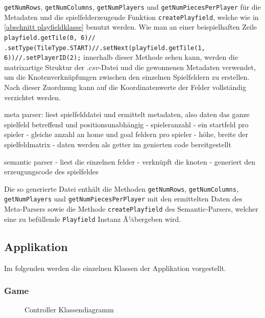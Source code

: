 \documentclass[conference]{IEEEtran}
\begin{document}
\texttt{getNumRows},
\texttt{getNumColumns},
\texttt{getNumPlayers} und
\texttt{getNumPiecesPerPlayer}
für die Metadaten und die spielfelderzeugende Funktion \texttt{createPlayfield}, welche wie in \ref{abschnitt playfieldklasse} benutzt werden. Wie man an einer beispielhaften Zeile \texttt{playfield.getTile(0, 6)// 
.setType(TileType.START)//.setNext(playfield.getTile(1, 6))//.setPlayerID(2);} innerhalb dieser Methode sehen kann, werden die matrixartige Struktur der $.csv$-Datei und die gewonnenen Metadaten verwendet, um die Knotenverknüpfungen zwischen den einzelnen Spielfeldern zu erstellen. Nach dieser Zuordnung kann auf die Koordinatenwerte der Felder vollständig
verzichtet werden.

meta parser:
 liest spielfelddatei und ermittelt metadaten, also daten das ganze spielfeld betreffend und positionsunabh\"angig
 - spieleranzahl
 - ein startfeld pro spieler
 - gleiche anzahl an home und goal feldern pro spieler
 - h\"ohe, breite der spielfeldmatrix
 - daten werden als getter im genierten code bereitgestellt

semantic parser
 - liest die einzelnen felder
 - verkn\"upft die knoten
 - generiert den erzeugungscode des spielfeldes

Die so generierte Datei enth\"alt die Methoden \texttt{getNumRows}, \texttt{getNumColumns}, \texttt{getNumPlayers} und \texttt{getNumPiecesPerPlayer} mit den ermittelten Daten des Meta-Parsers
sowie die Methode \texttt{createPlayfield} des Semantic-Parsers, welcher eine zu bef\"ullende \texttt{Playfield} Instanz Ã¼bergeben wird.



  \subsection{Applikation}

  Im folgenden werden die einzelnen Klassen der Applikation vorgestellt.

\subsubsection{Game}
\begin{figure}[]
    \centering
    \caption{Controller Klassendiagramm}
\end{figure}
\end{document}
